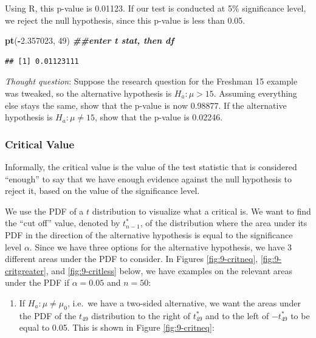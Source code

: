 \documentclass[
]{book}
\newenvironment{Shaded}{\begin{snugshade}}{\end{snugshade}}
\newcommand{\DecValTok}[1]{\textcolor[rgb]{0.00,0.00,0.81}{#1}}
\newcommand{\DocumentationTok}[1]{\textcolor[rgb]{0.56,0.35,0.01}{\textbf{\textit{#1}}}}
\newcommand{\FloatTok}[1]{\textcolor[rgb]{0.00,0.00,0.81}{#1}}
\newcommand{\FunctionTok}[1]{\textcolor[rgb]{0.13,0.29,0.53}{\textbf{#1}}}
\newcommand{\NormalTok}[1]{#1}
\newcommand{\SpecialCharTok}[1]{\textcolor[rgb]{0.81,0.36,0.00}{\textbf{#1}}}
\providecommand{\tightlist}{%
  \setlength{\itemsep}{0pt}\setlength{\parskip}{0pt}}
\begin{document}
Using R, this p-value is 0.01123. If our test is conducted at 5\% significance level, we reject the null hypothesis, since this p-value is less than 0.05.

\begin{Shaded}
\begin{Highlighting}[]
\FunctionTok{pt}\NormalTok{(}\SpecialCharTok{{-}}\FloatTok{2.357023}\NormalTok{, }\DecValTok{49}\NormalTok{) }\DocumentationTok{\#\#enter t stat, then df}
\end{Highlighting}
\end{Shaded}

\begin{verbatim}
## [1] 0.01123111
\end{verbatim}

\emph{Thought question}: Suppose the research question for the Freshman 15 example was tweaked, so the alternative hypothesis is \(H_a:\mu > 15\). Assuming everything else stays the same, show that the p-value is now 0.98877. If the alternative hypothesis is \(H_a: \mu \neq 15\), show that the p-value is 0.02246.

\hypertarget{critical-value-1}{%
\subsubsection{Critical Value}\label{critical-value-1}}

Informally, the critical value is the value of the test statistic that is considered ``enough'' to say that we have enough evidence against the null hypothesis to reject it, based on the value of the significance level.

We use the PDF of a \(t\) distribution to visualize what a critical is. We want to find the ``cut off'' value, denoted by \(t_{n-1}^*\), of the distribution where the area under its PDF in the direction of the alternative hypothesis is equal to the significance level \(\alpha\). Since we have three options for the alternative hypothesis, we have 3 different areas under the PDF to consider. In Figures \ref{fig:9-critneq}, \ref{fig:9-critgreater}, and \ref{fig:9-critless} below, we have examples on the relevant areas under the PDF if \(\alpha=0.05\) and \(n=50\):

\begin{enumerate}
\def\labelenumi{\arabic{enumi}.}
\tightlist
\item
  If \(H_a: \mu \neq \mu_0\), i.e.~we have a two-sided alternative, we want the areas under the PDF of the \(t_{49}\) distribution to the right of \(t_{49}^*\) and to the left of \(-t_{49}^*\) to be equal to 0.05. This is shown in Figure \ref{fig:9-critneq}:
\end{enumerate}
\end{document}
